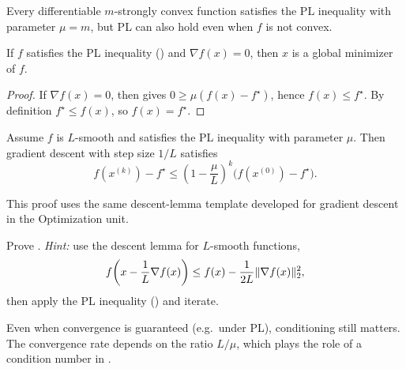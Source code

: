 \documentclass[11pt]{article}
\newif\ifshowsolutions
\newcommand{\SolutionBox}[2][10]{%
  \ifshowsolutions
    \begin{tcolorbox}[stat221panelgray,title={Solution}]
    #2
    \end{tcolorbox}
  \else
    \begin{tcolorbox}[stat221panelgray,unbreakable,title={Workspace}]
    \vspace{#1\baselineskip}
    \end{tcolorbox}
  \fi
}
\begin{document}
Every differentiable $m$-strongly convex function satisfies the PL inequality with parameter $\mu=m$, but PL can also hold even when $f$ is not convex.

\begin{proposition}
\label{prop:pl-no-spurious-stationary}
If $f$ satisfies the PL inequality () and $\nabla f(x)=0$, then $x$ is a global minimizer of $f$.
\end{proposition}

\begin{proof}
If $\nabla f(x)=0$, then  gives $0\ge \mu(f(x)-f^\star)$, hence $f(x)\le f^\star$.
By definition $f^\star\le f(x)$, so $f(x)=f^\star$.
\end{proof}

\begin{theorem}
\label{thm:gd-pl-linear}
Assume $f$ is $L$-smooth and satisfies the PL inequality with parameter $\mu$.
Then gradient descent with step size $1/L$ satisfies
\[
f(x^{(k)})-f^\star \le \left(1-\frac{\mu}{L}\right)^k \bigl(f(x^{(0)})-f^\star\bigr).
\]
\end{theorem}

This proof uses the same descent-lemma template developed for gradient descent in the Optimization unit.
\begin{exercise}
\label{ex:gd-pl-linear}
Prove .
\emph{Hint:} use the descent lemma for $L$-smooth functions,
\[
f\!\left(x-\frac{1}{L}\nabla f(x)\right)
\le f(x)-\frac{1}{2L}\lVert\nabla f(x)\rVert_2^2,
\]
then apply the PL inequality () and iterate.
\end{exercise}

\SolutionBox[10]{%
This is the same descent-lemma-plus-PL argument used in the Optimization unit.
By $L$-smoothness, the descent lemma gives
\[
f\!\left(x-\frac{1}{L}\nabla f(x)\right)
\le f(x)-\frac{1}{2L}\norm{\nabla f(x)}_2^2.
\]
Combine with PL to get
\[
f(x^+)-f^\star
\le f(x)-f^\star - \frac{\mu}{L}\bigl(f(x)-f^\star\bigr)
=\left(1-\frac{\mu}{L}\right)\bigl(f(x)-f^\star\bigr),
\]
and iterate.%
}

Even when convergence is guaranteed (e.g.\ under PL), conditioning still matters. The convergence rate depends on the ratio $L/\mu$, which plays the role of a condition number in .
\end{document}
